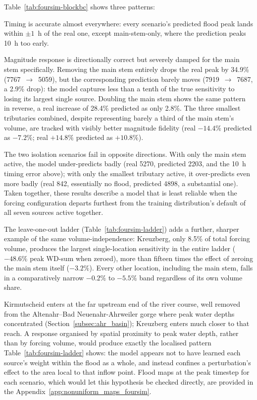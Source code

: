 \documentclass[12pt,a4paper]{report}
\begin{document}
{Table~\ref{tab:foursim-blockbc} shows three patterns:
 
Timing is
accurate almost everywhere: every scenario's predicted flood peak lands within
$\pm 1$~h of the real one, except main-stem-only, where the prediction peaks
10~h too early. 
 
Magnitude response is directionally correct but severely
damped for the main stem specifically. Removing the main stem entirely drops the real
peak by 34.9\% (7767~$\to$~5059), but the corresponding prediction barely moves
(7919~$\to$~7687, a 2.9\% drop): the model captures less than a tenth of the true
sensitivity to losing its largest single source. Doubling the main stem shows the same
pattern in reverse, a real increase of 28.4\% predicted as only 2.8\%. The three
smallest tributaries combined, despite representing barely a third of the main stem's
volume, are tracked with visibly better magnitude fidelity (real $-14.4\%$ predicted
as $-7.2\%$; real $+14.8\%$ predicted as $+10.8\%$). 
 
The two isolation
scenarios fail in opposite directions. With only the main stem active, the model
under-predicts badly (real 5270, predicted 2203, and the 10~h timing error above);
with only the smallest tributary active, it over-predicts even more badly (real 842,
essentially no flood, predicted 4898, a substantial one). Taken together, these results describe a model that is least reliable when the forcing configuration departs furthest from the training distribution's default of all seven sources active together.
 
The leave-one-out ladder (Table~\ref{tab:foursim-ladder}) adds a further, sharper example of the same
volume-independence: Kreuzberg, only 8.5\% of total forcing volume, produces the
largest single-location sensitivity in the entire ladder ($-48.6\%$ peak WD-sum when
zeroed), more than fifteen times the effect of zeroing the main stem itself ($-3.2\%$). Every other location, including the main stem, falls in a
comparatively narrow $-0.2\%$ to $-5.5\%$ band regardless of its own volume share.
 
Kirmutscheid enters at the far upstream end of the river course, well removed from
the Altenahr--Bad Neuenahr-Ahrweiler gorge where peak water depths concentrated
(Section~\ref{subsec:ahr_basin}); Kreuzberg enters much closer to that reach. A
response organised by spatial proximity to peak water depth, rather than by forcing
volume, would produce exactly the localised pattern Table~\ref{tab:foursim-ladder}
shows: the model appears not to have learned each source's weight within the flood
as a whole, and instead confines a perturbation's effect to the area local to that
inflow point.
Flood maps at the peak timestep for
each scenario, which would let this hypothesis be checked directly, are provided in
the Appendix~\ref{app:nonuniform_maps_foursim}.
 
}
\end{document}
